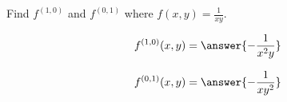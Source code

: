 \documentclass{ximera}
\author{David Guichard \and Neal Koblitz \and H. Jerome Keisler \and Albert Scheller \and Barry Balof \and Mike Wills \and Matthew Carr}
\begin{document}
\begin{exercise}




Find $f^{(1,0)}$ and $f^{(0,1)}$ where $f(x,y)=\frac{1}{xy}$.

\begin{prompt}
\[
f^{(1,0)}(x,y)=\answer{-\frac{1}{x^2 y}}
\]
\end{prompt}

\begin{prompt}
\[
f^{(0,1)}(x,y)=\answer{-\frac{1}{xy^2}}
\]
\end{prompt}


\end{exercise}
\end{document}
